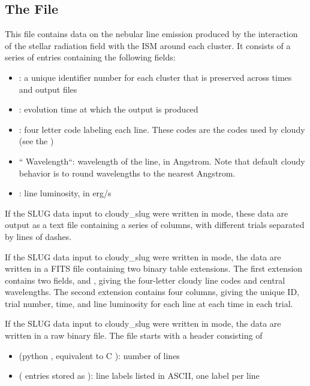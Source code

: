 \documentclass[letterpaper,10pt,english]{sphinxmanual}
\begin{document}
\subsection{The  File}
\label{\detokenize{cloudy:the-cluster-cloudylines-file}}
This file contains data on the nebular line emission produced by the
interaction of the stellar radiation field with the ISM around each
cluster. It consists of a series of entries containing the following
fields:
\begin{itemize}
\item {} 
: a unique identifier number for each cluster that is
preserved across times and output files

\item {} 
: evolution time at which the output is produced

\item {} 
: four letter code labeling each line. These codes
are the codes used by cloudy (see the )

\item {} 
“ Wavelength“: wavelength of the line, in Angstrom. Note that
default cloudy behavior is to round wavelengths to the nearest
Angstrom.

\item {} 
: line luminosity, in erg/s

\end{itemize}

If the SLUG data input to cloudy\_slug were written in  mode,
these data are output as a text file containing a series of columns,
with different trials separated by lines of dashes.

If the SLUG data input to cloudy\_slug were written in  mode,
the data are written in a FITS file containing two binary table
extensions. The first extension contains two fields,  and
, giving the four-letter cloudy line codes and central
wavelengths. The second extension contains four columns, giving the
unique ID, trial number, time, and line luminosity for each line at
each time in each trial.

If the SLUG data input to cloudy\_slug were written in  mode,
the data are written in a raw binary file. The file starts with a
header consisting of
\begin{itemize}
\item {} 
 (python , equivalent to C ): number of lines

\item {} 
 ( entries stored as ): line
labels listed in ASCII, one label per line

\end{itemize}
\end{document}
